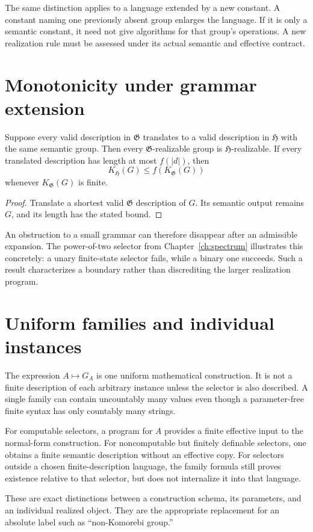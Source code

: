 The same distinction applies to a language extended by a new constant. A constant naming one previously absent group enlarges the language. If it is only a semantic constant, it need not give algorithms for that group's operations. A new realization rule must be assessed under its actual semantic and effective contract.

\section{Monotonicity under grammar extension}
\begin{proposition}
\label{thm:grammarextension}
Suppose every valid description in $\mathfrak G$ translates to a valid description in $\mathfrak H$ with the same semantic group. Then every $\mathfrak G$-realizable group is $\mathfrak H$-realizable. If every translated description has length at most $f(\lvert d\rvert)$, then
\[
K_{\mathfrak H}(G)\le f(K_{\mathfrak G}(G))
\]
whenever $K_{\mathfrak G}(G)$ is finite.
\end{proposition}
\begin{proof}
Translate a shortest valid $\mathfrak G$ description of $G$. Its semantic output remains $G$, and its length has the stated bound.
\end{proof}
An obstruction to a small grammar can therefore disappear after an admissible expansion. The power-of-two selector from Chapter~\ref{ch:spectrum} illustrates this concretely: a unary finite-state selector fails, while a binary one succeeds. Such a result characterizes a boundary rather than discrediting the larger realization program.

\section{Uniform families and individual instances}
The expression $A\mapsto G_A$ is one uniform mathematical construction. It is not a finite description of each arbitrary instance unless the selector is also described. A single family can contain uncountably many values even though a parameter-free finite syntax has only countably many strings.

For computable selectors, a program for $A$ provides a finite effective input to the normal-form construction. For noncomputable but finitely definable selectors, one obtains a finite semantic description without an effective copy. For selectors outside a chosen finite-description language, the family formula still proves existence relative to that selector, but does not internalize it into that language.

These are exact distinctions between a construction schema, its parameters, and an individual realized object. They are the appropriate replacement for an absolute label such as ``non-Komorebi group.''
